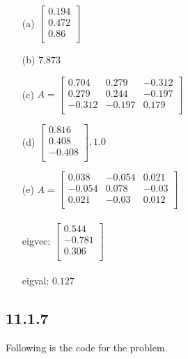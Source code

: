 \documentclass{article}
\begin{document}
\begin{enumerate}
    \item [(a)] $\begin{bmatrix} 0.194 \\ 0.472 \\ 0.86 \\  \end{bmatrix}$
    \item [(b)] $7.873$
    \item [(c)] 
    $A = \begin{bmatrix}
            0.704 & 0.279 & -0.312 \\
            0.279 & 0.244 & -0.197 \\
            -0.312 & -0.197 & 0.179 \\            
    \end{bmatrix}$
    \\
    \item [(d)] $\begin{bmatrix}  0.816 \\  0.408 \\ -0.408 \\ \end{bmatrix}, 1.0$
    \item [(e)]
    $A = \begin{bmatrix} 
            0.038 & -0.054 & 0.021 \\
            -0.054 & 0.078 & -0.03 \\
            0.021 & -0.03 & 0.012 \\
    \end{bmatrix}$ \\
    \\
    eigvec: $\begin{bmatrix} 0.544 \\ -0.781 \\ 0.306 \\ \end{bmatrix}$ \\
    \\
    eigval: $0.127$
\end{enumerate}

\subsection*{11.1.7}
Following is the code for the problem.
\end{document}
